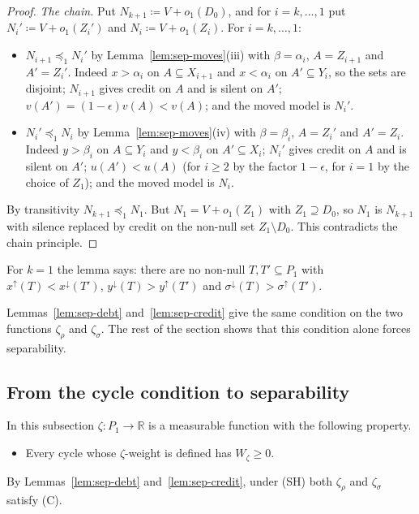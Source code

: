 \documentclass[11pt]{article}
\theoremstyle{definition}\newtheorem{definition}[theorem]{Definition}
\theoremstyle{remark}\newtheorem{remark}[theorem]{Remark}
\begin{document}
\begin{proof}
\emph{The chain.} Put $N_{k+1}\coloneqq V+o_1(D_0)$, and for $i=k,\dots,1$
put $N_i'\coloneqq V+o_1(Z_i')$ and $N_i\coloneqq V+o_1(Z_i)$. For
$i=k,\dots,1$:
\begin{itemize}[leftmargin=*,itemsep=2pt]
\item $N_{i+1}\preceq_1N_i'$ by Lemma~\ref{lem:sep-moves}(iii) with
$\beta=\alpha_i$, $A=Z_{i+1}$ and $A'=Z_i'$. Indeed $x>\alpha_i$ on
$A\subseteq X_{i+1}$ and $x<\alpha_i$ on $A'\subseteq Y_i$, so the sets are
disjoint; $N_{i+1}$ gives credit on $A$ and is silent on $A'$;
$v(A')=(1-\epsilon)v(A)<v(A)$; and the moved model is $N_i'$.
\item $N_i'\preceq_1N_i$ by Lemma~\ref{lem:sep-moves}(iv) with
$\beta=\beta_i$, $A=Z_i'$ and $A'=Z_i$. Indeed $y>\beta_i$ on $A\subseteq Y_i$
and $y<\beta_i$ on $A'\subseteq X_i$; $N_i'$ gives credit on $A$ and is silent
on $A'$; $u(A')<u(A)$ (for $i\ge2$ by the factor $1-\epsilon$, for $i=1$ by
the choice of $Z_1$); and the moved model is $N_i$.
\end{itemize}
By transitivity $N_{k+1}\preceq_1N_1$. But $N_1=V+o_1(Z_1)$ with
$Z_1\supseteq D_0$, so $N_1$ is $N_{k+1}$ with silence replaced by credit on
the non-null set $Z_1\setminus D_0$. This contradicts the chain principle.
\end{proof}

For $k=1$ the lemma says: there are no non-null $T,T'\subseteq P_1$ with
$x^{\uparrow}(T)<x^{\downarrow}(T')$, $y^{\downarrow}(T)>y^{\uparrow}(T')$ and
$\sigma^{\downarrow}(T)>\sigma^{\uparrow}(T')$.

Lemmas~\ref{lem:sep-debt} and~\ref{lem:sep-credit} give the same condition on
the two functions $\zeta_\rho$ and $\zeta_\sigma$. The rest of the section
shows that this condition alone forces separability.

\subsection{From the cycle condition to separability}

In this subsection $\zeta\colon P_1\to\mathbb R$ is a measurable function with
the following property.
\begin{itemize}[leftmargin=*,itemsep=1pt]
\item[(C)] Every cycle whose $\zeta$-weight is defined has $W_\zeta\ge0$.
\end{itemize}
By Lemmas~\ref{lem:sep-debt} and~\ref{lem:sep-credit}, under (SH) both
$\zeta_\rho$ and $\zeta_\sigma$ satisfy (C).
\end{document}
